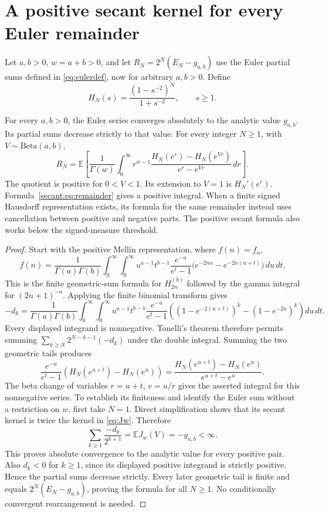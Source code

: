 \section{A positive secant kernel for every Euler remainder}
\label{sec:secant}
Let $a,b>0$, $w=a+b>0$, and let $R_N=2^N(E_N-g_{a,b})$
use the Euler partial sums defined in \eqref{eq:eulerdef}, now for arbitrary $a,b>0$. Define
\[
 H_N(s)=\frac{(1-s^{-2})^N}{1+s^{-2}},\qquad s\ge1.
\]
\begin{theorem}
For every $a,b>0$, the Euler series converges absolutely to the analytic
value $g_{a,b}$. Its partial sums decrease strictly to that value.
For every integer $N\ge1$, with $V\sim\mathrm{Beta}(a,b)$,
\begin{equation}\label{secant:eq:remainder}
 R_N=\mathbb E\!\left[\frac1{\Gamma(w)}\int_0^\infty
 r^{w-1}\frac{H_N(e^r)-H_N(e^{Vr})}{e^r-e^{Vr}}\,dr\right].
\end{equation}
The quotient is positive for $0<V<1$. Its extension to $V=1$ is
$H_N'(e^r)$. Formula~\eqref{secant:eq:remainder} gives a positive
integral. When a finite signed Hausdorff representation exists, its
formula for the same remainder instead uses cancellation between
positive and negative parts. The positive secant formula also works
below the signed-measure threshold.
\end{theorem}
\begin{proof}

Start with the positive Mellin representation, where $f(n)=f_n$,
\[
 f(n)=\frac1{\Gamma(a)\Gamma(b)}\int_0^\infty\!\int_0^\infty
 u^{a-1}t^{b-1}\frac{e^{-u}}{e^t-1}
 \bigl(e^{-2nu}-e^{-2n(u+t)}\bigr)\,du\,dt.
\]
This is the finite geometric-sum formula for $H_{2n}^{(b)}$ followed
by the gamma integral for $(2n+1)^{-a}$. Applying the finite binomial
transform gives
\[
 -d_k=\frac1{\Gamma(a)\Gamma(b)}\int_0^\infty\!\int_0^\infty
 u^{a-1}t^{b-1}\frac{e^{-u}}{e^t-1}
 \left((1-e^{-2(u+t)})^k-(1-e^{-2u})^k\right)du\,dt.
\]
Every displayed integrand is nonnegative. Tonelli's theorem therefore
permits summing $\sum_{k\ge N}2^{N-k-1}(-d_k)$ under the double
integral. Summing the two geometric tails produces
\[
 \frac{e^{-u}}{e^t-1}
 \left(H_N(e^{u+t})-H_N(e^u)\right)
 =\frac{H_N(e^{u+t})-H_N(e^u)}{e^{u+t}-e^u}.
\]
The beta change of variables $r=u+t$, $v=u/r$ gives the asserted
integral for this nonnegative series. To establish its finiteness and
identify the Euler sum without a restriction on $w$, first take $N=1$.
Direct simplification shows that its secant kernel is twice the
kernel in \eqref{eq:Jw}. Therefore
\[
 \sum_{k\ge1}\frac{-d_k}{2^{k+1}}
   =\mathbb E J_w(V)=-g_{a,b}<\infty.
\]
This proves absolute convergence to the analytic value for every
positive pair. Also $d_k<0$ for $k\ge1$, since its displayed positive
integrand is strictly positive. Hence the partial sums decrease
strictly. Every later geometric tail is finite and equals
$2^N(E_N-g_{a,b})$, proving the formula for all $N\ge1$.
No conditionally convergent rearrangement is needed.
\end{proof}

